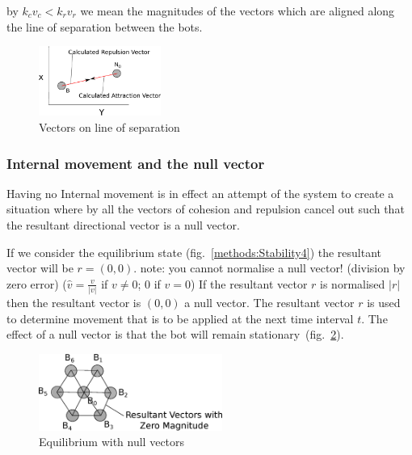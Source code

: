 \documentclass[10pt,journal,letterpaper,twoside]{IEEEtran}
\newcommand{\Stability}{Internal movement}
\newcommand{\Fig}{fig.}
\begin{document}
by $k_cv_c < k_rv_r$ we mean the magnitudes of the vectors which are
aligned along the line of separation between the bots.

\begin{figure}[H]
\begin{center}
\includegraphics[width=4cm]{figures/Stability5}
\end{center}
\caption{Vectors on line of separation} \label{methods:Stability5}
\end{figure}

\subsubsection{\Stability{} and the null vector}\label{Section:StabilityNullVector}

Having no \Stability{} is in effect an attempt of the system to create
a situation where by all the vectors of cohesion and repulsion cancel
out such that the resultant directional vector is a null vector.

If we consider the equilibrium state (\Fig{}~\ref{methods:Stability4})
the resultant vector will be $r = (0,0)$. note: you cannot normalise a
null vector! (division by zero error) ($\hat{v} = \frac{v}{|v|}$ if
$v\neq0$; $0$ if $v=0$) If the resultant vector $r$ is normalised
$|r|$ then the resultant vector is $(0,0)$ a null vector. The
resultant vector $r$ is used to determine movement that is to be
applied at the next time interval $t$. The effect of a null vector is
that the bot will remain
stationary~(\Fig{}~\ref{methods:StabilityNullVector}).

\begin{figure}[H]
\begin{center}
\includegraphics[width=6cm]{figures/StabilityNullVector}
\end{center}
\caption{Equilibrium with null vectors} \label{methods:StabilityNullVector}
\end{figure}
\end{document}
